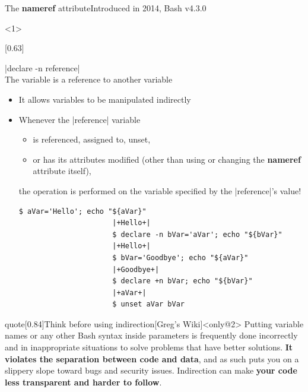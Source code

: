 
\begin{frame}[fragile]{The \textbf{nameref} attribute}{Introduced in 2014, Bash v4.3.0}
    \vspace{-1mm}
    \begin{onlyenv}<1>
        \vspace{-1mm}
        \begin{varblock}{}[0.63\textwidth]{}
        \begin{description}
            \item[\textbf{Reference:}]
                \bash|declare -n reference|\\
                The variable is a reference to another variable
        \end{description}
        \end{varblock}
        \begin{itemize}
            \item It allows variables to be manipulated indirectly
            \item Whenever the \bash|reference| variable
                  \begin{itemize}
                      \item is referenced, assigned to, unset,
                      \item or has its attributes modified (other than using or changing the \textbf{nameref} attribute itself),
                  \end{itemize}
                  the operation is performed on the variable specified by the \bash|reference|'s value!
                  \begin{lstlisting}[style=MyBash, style=oddnumbers, xleftmargin=6mm, xrightmargin=15mm, aboveskip=3mm]
                      $ aVar='Hello'; echo "${aVar}"
                      |+Hello+|
                      $ declare -n bVar='aVar'; echo "${bVar}"
                      |+Hello+|
                      $ bVar='Goodbye'; echo "${aVar}"
                      |+Goodbye+|
                      $ declare +n bVar; echo "${bVar}"
                      |+aVar+|
                      $ unset aVar bVar
                  \end{lstlisting}
        \end{itemize}
    \end{onlyenv}
    \begin{varblock}{quote}[0.84\textwidth]{Think before using indirection}[Greg's Wiki]<only@2>
        Putting variable names or any other Bash syntax inside parameters is frequently done incorrectly and in inappropriate situations to solve problems that have better solutions.
        \textbf{It violates the separation between code and data}, and as such puts you on a slippery slope toward bugs and security issues.
        Indirection can make \textbf{your code less transparent and harder to follow}.


\end{varblock}
\end{frame}
